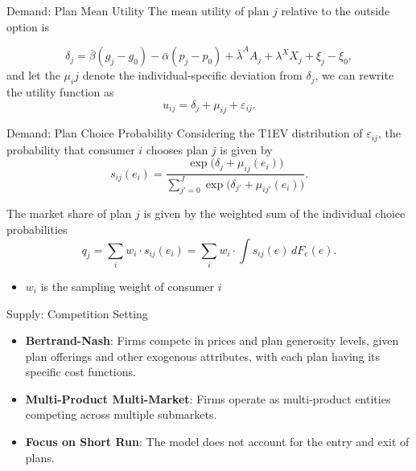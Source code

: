 \documentclass[professionalfonts, aspectratio=169]{beamer}
\begin{document}
\begin{frame}{Demand: Plan Mean Utility}
  The mean utility of plan $j$ relative to the outside option is

  \begin{equation}
    \delta_j = \bar{\beta} (g_j - g_0) - \bar{\alpha} (p_j - p_0) + \bar{\lambda}^{A} A_j + \lambda^X X_j + \xi_j - \xi_0,
  \end{equation}
  and let the $\mu_ij$ denote the individual-specific deviation from $\delta_j$, we can rewrite the utility function as
  \begin{equation}
    u_{ij} = \delta_j + \mu_{ij} + \varepsilon_{ij}.
  \end{equation}

\end{frame}

  

\begin{frame}{Demand: Plan Choice Probability}
  Considering the T1EV distribution of $\varepsilon_{ij}$, the probability that consumer $i$ chooses plan $j$ is given by
  \begin{equation}
    s_{ij}(e_i) = 
    \frac{\exp \big(\delta_j + \mu_{ij}(e_i) \big)}
    {\sum_{j' = 0}^{J}  \exp \big(\delta_{j'} + \mu_{ij'}(e_i) \big)}.
  \end{equation}

  The market share of plan $j$ is given by the weighted sum of the individual choice probabilities
  \begin{equation}
    q_j = \sum_i w_i \cdot s_{ij}(e_i) = \sum_i w_i \cdot \int s_{ij}(e) \, dF_{e}(e).
\end{equation}
\begin{itemize}\small
  \item $w_i$ is the sampling weight of consumer $i$
\end{itemize}

\end{frame}

\begin{frame}{Supply: Competition Setting}
  \begin{itemize}
    \item \textbf{Bertrand-Nash}: Firms compete in prices and plan generosity levels, given plan offerings and other exogenous attributes, with each plan having its specific cost functions.
    \item \textbf{Multi-Product Multi-Market}: Firms operate as multi-product entities competing across multiple submarkets.
    \item \textbf{Focus on Short Run}: The model does not account for the entry and exit of plans.
  \end{itemize}
\end{frame}
\end{document}
